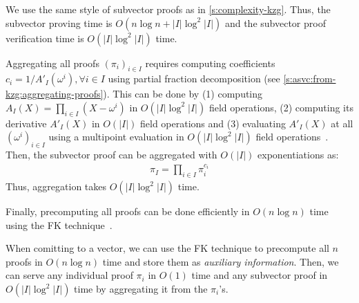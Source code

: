 We use the same style of subvector proofs as in \cref{s:complexity-kzg}.
Thus, the subvector proving time is $O(n\log{n}+|I|\log^2{|I|})$ and the subvector proof verification time is $O(|I|\log^2{|I|})$ time.

Aggregating all proofs $(\pi_i)_{i\in I}$ requires computing coefficients $c_i=1/A'_I(\omega^i),\forall i \in I$ using partial fraction decomposition (see \cref{s:asvc:from-kzg:aggregating-proofs}).
This can be done by (1) computing $A_I(X)=\prod_{i \in I} (X-\omega^i)$ in $O(|I|\log^2{|I|})$ field operations, (2) computing its derivative $A'_I(X)$ in $O(|I|)$ field operations and (3) evaluating $A'_I(X)$ at all $(\omega^i)_{i\in I}$ using a multipoint evaluation in $O(|I|\log^2|I|)$ field operations~\cite{vG13ModernCh10}.
Then, the subvector proof can be aggregated with $O(|I|)$ exponentiations as:
\begin{align}
\pi_I = \prod_{i\in I}\pi_i^{c_i}
\end{align}
Thus, aggregation takes $O(|I|\log^2{|I|})$ time.

Finally, precomputing all proofs can be done efficiently in $O(n\log{n})$ time using the FK technique~\cite{FK20}.

When comitting to a vector, we can use the FK technique to precompute all $n$ proofs in $O(n\log{n})$ time and store them as \textit{auxiliary information}.
Then, we can serve any individual proof $\pi_i$ in $O(1)$ time and any subvector proof in $O(|I|\log^2{|I|})$ time by aggregating it from the $\pi_i$'s.